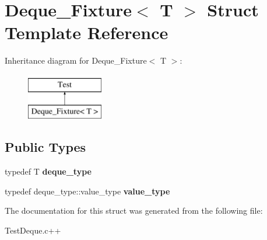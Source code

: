 \hypertarget{structDeque__Fixture}{\section{Deque\-\_\-\-Fixture$<$ T $>$ Struct Template Reference}
\label{structDeque__Fixture}
}
Inheritance diagram for Deque\-\_\-\-Fixture$<$ T $>$\-:\begin{figure}[H]
\begin{center}
\leavevmode
\includegraphics[height=2.000000cm]{structDeque__Fixture}
\end{center}
\end{figure}
\subsection*{Public Types}
\begin{DoxyCompactItemize}
\item 
\hypertarget{structDeque__Fixture_aff55aebc9f3732e55b5e9afae069a6e7}{typedef T {\bfseries deque\-\_\-type}}\label{structDeque__Fixture_aff55aebc9f3732e55b5e9afae069a6e7}

\item 
\hypertarget{structDeque__Fixture_ad3f31d2190bcef2a8809aae173c159e9}{typedef deque\-\_\-type\-::value\-\_\-type {\bfseries value\-\_\-type}}\label{structDeque__Fixture_ad3f31d2190bcef2a8809aae173c159e9}

\end{DoxyCompactItemize}


The documentation for this struct was generated from the following file\-:\begin{DoxyCompactItemize}
\item 
Test\-Deque.\-c++\end{DoxyCompactItemize}
